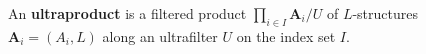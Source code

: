 An \textbf{ultraproduct} is a filtered product $\prod_{i \in I} \mathbf{A}_i / U$ of $L$-structures $\mathbf{A}_i = (A_i, L)$ along an ultrafilter $U$ on the index set $I$.

